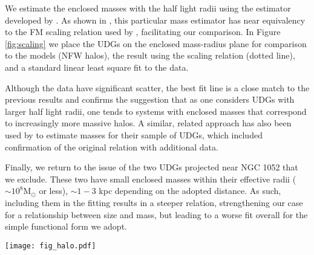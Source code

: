 \documentclass[twocolumn,tighten]{aastex63}
\begin{document}
\begin{appendix}
We estimate the enclosed masses with the half light radii using the estimator developed by \cite{Walker}. As shown in \cite{Zaritsky2012}, this particular mass estimator has near equivalency to the FM scaling relation used by \cite{Zaritsky2017}, facilitating our comparison. In Figure \ref{fig:scaling} we place the UDGs on the enclosed mass-radius plane for comparison to the models (NFW halos), the \cite{Zaritsky2017} result using the scaling relation (dotted line), and a standard linear least square fit to the data.

Although the data have significant scatter, the best fit line is a close match to the previous results and confirms the suggestion that as one considers UDGs with larger half light radii, one tends to systems with enclosed masses that correspond to increasingly more massive halos.
A similar, related approach has also been used by \cite{Lee2020} to estimate masses for their sample of UDGs, which included confirmation of the original relation with additional data.

Finally, we return to the issue of the two UDGs projected near NGC 1052 that we exclude. These two have small enclosed masses within their effective radii ($\sim 10^8 \text{M}_\odot$ or less), $\sim 1 - 3$ kpc depending on the adopted distance. As such, including them in the fitting results in a steeper relation, strengthening our case for a relationship between size and mass, but leading to a worse fit overall for the simple functional form we adopt.

\begin{figure*}[t]
\center
\texttt{[image: fig\_halo.pdf]}
\caption{Enclosed mass vs. half light radius for UDGs. Enclosed masses are estimated using the \cite{Walker} mass estimator. The observed UDGs are shown, with error bars reflecting only the uncertainties on the velocity dispersion (references for the UDG data are given in the text). The three curves show the enclosed mass as a function of radius for NFW halos of the given virial mass. The dotted line represents the trend derived using the FM scaling relation by \cite{Zaritsky2017}. The solid straight line represents the linear least squares fit to the data ($M(<r) = 10^{8.2}r_e^{2.4}$).}
\label{fig:scaling}
\end{figure*}
\end{appendix}

\nocite{*}

\end{document}
